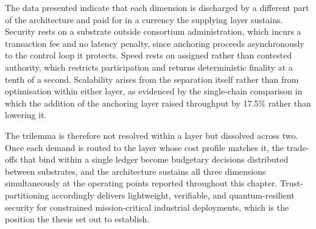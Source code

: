 The data presented indicate that each dimension is discharged by a different part of the architecture and paid for in a currency the supplying layer sustains. Security rests on a substrate outside consortium administration, which incurs a transaction fee and no latency penalty, since anchoring proceeds asynchronously to the control loop it protects. Speed rests on assigned rather than contested authority, which restricts participation and returns deterministic finality at a tenth of a second. Scalability arises from the separation itself rather than from optimisation within either layer, as evidenced by the single-chain comparison in which the addition of the anchoring layer raised throughput by 17.5\% rather than lowering it.

The trilemma is therefore not resolved within a layer but dissolved across two. Once each demand is routed to the layer whose cost profile matches it, the trade-offs that bind within a single ledger become budgetary decisions distributed between substrates, and the architecture sustains all three dimensions simultaneously at the operating points reported throughout this chapter. Trust-partitioning accordingly delivers lightweight, verifiable, and quantum-resilient security for constrained mission-critical industrial deployments, which is the position the thesis set out to establish.
